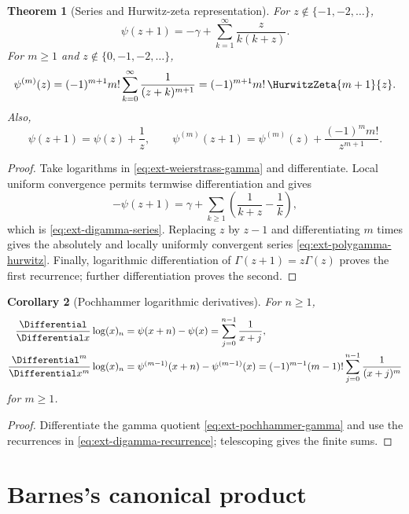 \documentclass[11pt,a4paper,oneside,openany]{book}
\newtheorem{theorem}{Theorem}[chapter]
\newtheorem{corollary}[theorem]{Corollary}
\theoremstyle{definition}
\theoremstyle{remark}
\begin{document}
\begin{theorem}[Series and Hurwitz-zeta representation]
For \(z\notin\{-1,-2,\ldots\}\),
\begin{equation}\label{eq:ext-digamma-series}
 \psi(z+1)=-\gamma+\sum_{k=1}^\infty\frac{z}{k(k+z)}.
\end{equation}
For \(m\ge1\) and \(z\notin\{0,-1,-2,\ldots\}\),
\begin{equation}\label{eq:ext-polygamma-hurwitz}
 \psi^{(m)}(z)=(-1)^{m+1}m!
 \sum_{k=0}^\infty\frac1{(z+k)^{m+1}}
 =(-1)^{m+1}m!\,\HurwitzZeta{m+1}{z}.
\end{equation}
Also,
\begin{equation}\label{eq:ext-digamma-recurrence}
 \psi(z+1)=\psi(z)+\frac1z,
 \qquad
 \psi^{(m)}(z+1)=\psi^{(m)}(z)+\frac{(-1)^m m!}{z^{m+1}}.
\end{equation}
\end{theorem}
\begin{proof}
Take logarithms in \eqref{eq:ext-weierstrass-gamma} and differentiate.  Local
uniform convergence permits termwise differentiation and gives
\[
 -\psi(z+1)=\gamma+\sum_{k\ge1}
 \left(\frac1{k+z}-\frac1k\right),
\]
which is \eqref{eq:ext-digamma-series}.  Replacing \(z\) by \(z-1\) and
differentiating \(m\) times gives the absolutely and locally uniformly
convergent series \eqref{eq:ext-polygamma-hurwitz}.  Finally, logarithmic
differentiation of \(\Gamma(z+1)=z\Gamma(z)\) proves the first recurrence;
further differentiation proves the second.
\end{proof}

\begin{corollary}[Pochhammer logarithmic derivatives]
For \(n\ge1\),
\begin{align}
 \frac{\Differential}{\Differential x}\log(x)_n
 &=\psi(x+n)-\psi(x)=\sum_{j=0}^{n-1}\frac1{x+j},
 \label{eq:ext-pochhammer-log-derivative}\\
 \frac{\Differential^m}{\Differential x^m}\log(x)_n
 &=\psi^{(m-1)}(x+n)-\psi^{(m-1)}(x)
 =(-1)^{m-1}(m-1)!\sum_{j=0}^{n-1}\frac1{(x+j)^m}
 \label{eq:ext-pochhammer-higher-log-derivative}
\end{align}
for \(m\ge1\).
\end{corollary}
\begin{proof}
Differentiate the gamma quotient \eqref{eq:ext-pochhammer-gamma} and use the
recurrences in \eqref{eq:ext-digamma-recurrence}; telescoping gives the finite
sums.
\end{proof}

\section{Barnes's canonical product}
\end{document}
